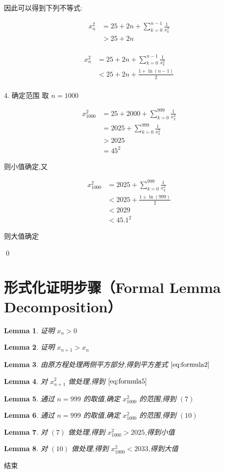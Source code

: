 \documentclass[11pt]{article}
\newtheorem{lemma}{Lemma}
\begin{document}
因此可以得到下列不等式:

\begin{align}
    x_{n}^2 & = 25 + 2n + \sum_{k=0}^{n-1}\frac{1}{x_k^2}\\
    & > 25 + 2n \\
\end{align}

\begin{align}
    x_{n}^2 & = 25 + 2n + \sum_{k=0}^{n-1}\frac{1}{x_k^2}\\
    & < 25 + 2n + \frac{1 + \ln (n-1)}{2}\\
\end{align}

4. 确定范围 取 $n = 1000$

\begin{align}
x_{1000}^2 & = 25 + 2000 + \sum_{k=0}^{999}\frac{1}{x_k^2}\\
& = 2025 + \sum_{k=0}^{999}\frac{1}{x_k^2} \\
& > 2025 \\
& = 45^2
\end{align}

则小值确定,又

\begin{align}
x_{1000}^2 & = 2025 + \sum_{k=0}^{999}\frac{1}{x_k^2} \\
& < 2025 + \frac{1 + \ln (999)}{2} \\
& < 2029 \\ 
& < 45.1^2
\end{align}

则大值确定

\qed


\section*{形式化证明步骤（Formal Lemma Decomposition）}

\begin{lemma}
    证明 $x_n > 0$
\end{lemma}

\begin{lemma}
    证明 $x_{n+1} > x_n$
\end{lemma}

\begin{lemma}
    由原方程处理两侧平方部分,得到平方差式 $\eqref{eq:formula2}$
\end{lemma}

\begin{lemma}
    对 $x_{n+1}^2$ 做处理,得到 $\eqref{eq:formula5}$
\end{lemma}

\begin{lemma}
    通过 $n=999$ 的取值,确定 $x_{1000}^2$ 的范围,得到 $(7)$
\end{lemma}

\begin{lemma}
    通过 $n=999$ 的取值,确定 $x_{1000}^2$ 的范围,得到 $(10)$
\end{lemma}

\begin{lemma}
    对 $(7)$ 做处理,得到 $x_{1000}^2 > 2025$,得到小值
\end{lemma}

\begin{lemma}
    对 $(10)$ 做处理,得到 $x_{1000}^2 < 2033$,得到大值
\end{lemma}

结束
\end{document}
